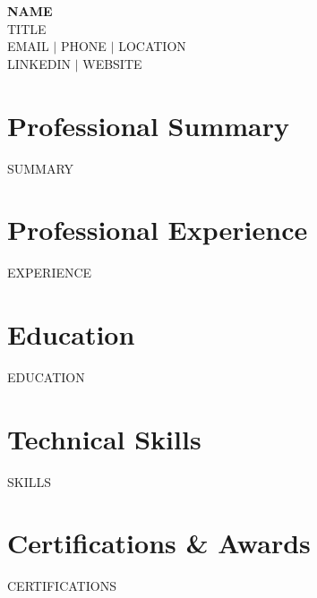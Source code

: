 \documentclass[10pt,a4paper]{article}
\begin{document}
\begin{center}
{\Huge\bfseries {{NAME}}}\\[0.5em]
{\Large\color{secondary} {{TITLE}}}\\[1em]
\color{accent} {{EMAIL}} $\mid$ {{PHONE}} $\mid$ {{LOCATION}}\\
{{LINKEDIN}} $\mid$ {{WEBSITE}}
\end{center}

\vspace{1.5em}

\section{Professional Summary}
\color{text}
{{SUMMARY}}

\section{Professional Experience}
{{EXPERIENCE}}

\section{Education}
{{EDUCATION}}

\section{Technical Skills}
{{SKILLS}}

\section{Certifications \& Awards}
{{CERTIFICATIONS}}
\end{document}

